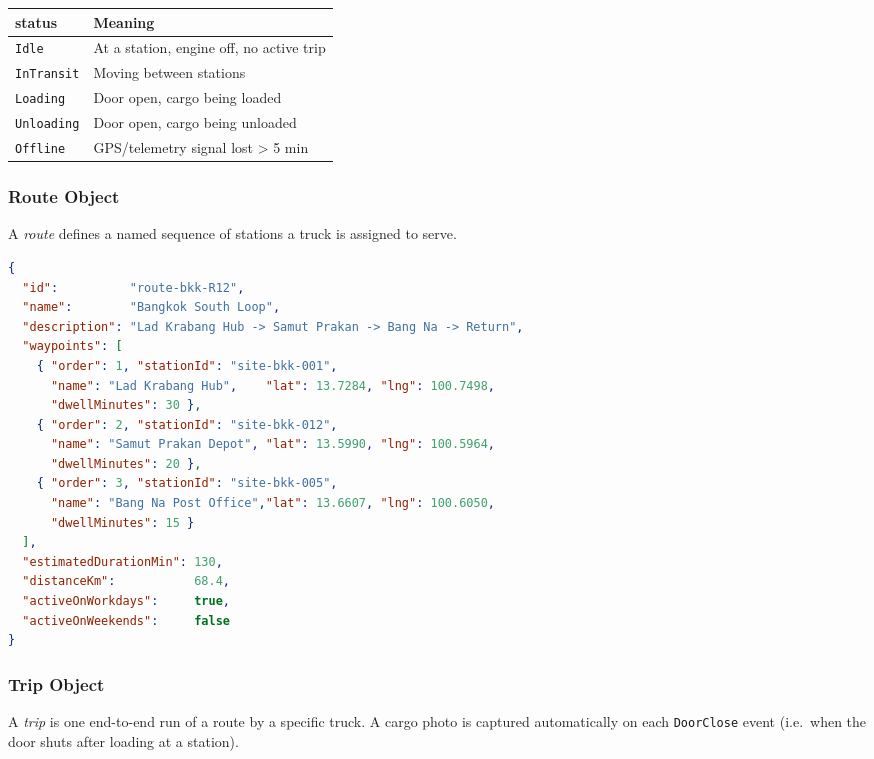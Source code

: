 \documentclass{article}
\begin{document}
\begin{center}
\begin{tabular}{ll}
\toprule
\textbf{status} & \textbf{Meaning}\\
\midrule
\texttt{Idle}       & At a station, engine off, no active trip\\
\texttt{InTransit}  & Moving between stations\\
\texttt{Loading}    & Door open, cargo being loaded\\
\texttt{Unloading}  & Door open, cargo being unloaded\\
\texttt{Offline}    & GPS/telemetry signal lost \textgreater{} 5 min\\
\bottomrule
\end{tabular}
\end{center}

\subsubsection{Route Object}

A \emph{route} defines a named sequence of stations a truck is assigned to serve.

\begin{lstlisting}[language=json, caption=Route object schema]
{
  "id":          "route-bkk-R12",
  "name":        "Bangkok South Loop",
  "description": "Lad Krabang Hub -> Samut Prakan -> Bang Na -> Return",
  "waypoints": [
    { "order": 1, "stationId": "site-bkk-001",
      "name": "Lad Krabang Hub",    "lat": 13.7284, "lng": 100.7498,
      "dwellMinutes": 30 },
    { "order": 2, "stationId": "site-bkk-012",
      "name": "Samut Prakan Depot", "lat": 13.5990, "lng": 100.5964,
      "dwellMinutes": 20 },
    { "order": 3, "stationId": "site-bkk-005",
      "name": "Bang Na Post Office","lat": 13.6607, "lng": 100.6050,
      "dwellMinutes": 15 }
  ],
  "estimatedDurationMin": 130,
  "distanceKm":           68.4,
  "activeOnWorkdays":     true,
  "activeOnWeekends":     false
}
\end{lstlisting}

\subsubsection{Trip Object}

A \emph{trip} is one end-to-end run of a route by a specific truck.
A cargo photo is captured automatically on each \texttt{DoorClose} event
(i.e.\ when the door shuts after loading at a station).
\end{document}
